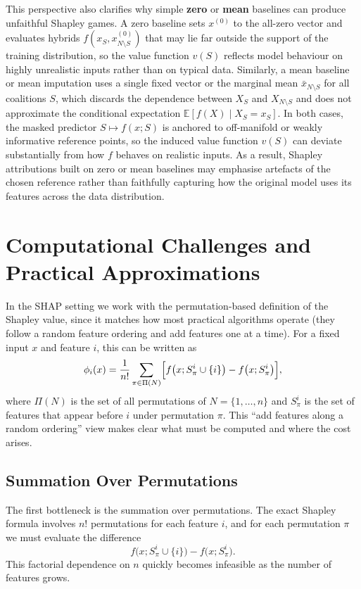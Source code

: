 \documentclass{article}
\begin{document}
This perspective also clarifies why simple \textbf{zero} or \textbf{mean} baselines can produce unfaithful Shapley games.
A zero baseline sets $x^{(0)}$ to the all-zero vector and evaluates hybrids $f(x_S, x^{(0)}_{N \setminus S})$ that may lie far outside the support of the training distribution, so the value function $v(S)$ reflects model behaviour on highly unrealistic inputs rather than on typical data.
Similarly, a mean baseline or mean imputation uses a single fixed vector or the marginal mean $\bar{x}_{N \setminus S}$ for all coalitions $S$, which discards the dependence between $X_S$ and $X_{N \setminus S}$ and does not approximate the conditional expectation $\mathbb{E}[f(X) \mid X_S = x_S]$.
In both cases, the masked predictor $S \mapsto f(x; S)$ is anchored to off-manifold or weakly informative reference points, so the induced value function $v(S)$ can deviate substantially from how $f$ behaves on realistic inputs.
As a result, Shapley attributions built on zero or mean baselines may emphasise artefacts of the chosen reference rather than faithfully capturing how the original model uses its features across the data distribution.

\section{Computational Challenges and Practical Approximations}

In the SHAP setting we work with the permutation-based definition of the Shapley value, since it matches how most practical algorithms operate (they follow a random feature ordering and add features one at a time).
For a fixed input $x$ and feature $i$, this can be written as
\[
\phi_i(x)
= \frac{1}{n!} \sum_{\pi \in \Pi(N)}
\Bigl[ f\bigl(x; S_\pi^i \cup \{i\}\bigr) - f\bigl(x; S_\pi^i\bigr) \Bigr],
\]
where $\Pi(N)$ is the set of all permutations of $N = \{1,\dots,n\}$ and $S_\pi^i$ is the set of features that appear before $i$ under permutation $\pi$.
This “add features along a random ordering” view makes clear what must be computed and where the cost arises.

\subsection{Summation Over Permutations}

The first bottleneck is the summation over permutations.
The exact Shapley formula involves $n!$ permutations for each feature $i$, and for each permutation $\pi$ we must evaluate the difference
\[
f\bigl(x; S_\pi^i \cup \{i\}\bigr) - f\bigl(x; S_\pi^i\bigr).
\]
This factorial dependence on $n$ quickly becomes infeasible as the number of features grows.
\end{document}

